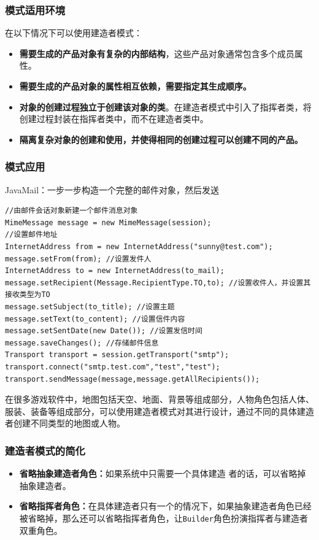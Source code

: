 \subsubsection{模式适用环境}
在以下情况下可以使用建造者模式：
\begin{itemize}
    \item \textbf{需要生成的产品对象有复杂的内部结构}，这些产品对象通常包含多个成员属性。
    \item \textbf{需要生成的产品对象的属性相互依赖，需要指定其生成顺序。}
    \item \textbf{对象的创建过程独立于创建该对象的类}。在建造者模式中引入了指挥者类，将创建过程封装在指挥者类中，而不在建造者类中。
    \item \textbf{隔离复杂对象的创建和使用，并使得相同的创建过程可以创建不同的产品。}
\end{itemize}

\subsubsection{模式应用}
 JavaMail：一步一步构造一个完整的邮件对象，然后发送
\begin{lstlisting}
//由邮件会话对象新建一个邮件消息对象
MimeMessage message = new MimeMessage(session);
//设置邮件地址
InternetAddress from = new InternetAddress("sunny@test.com");
message.setFrom(from); //设置发件人
InternetAddress to = new InternetAddress(to_mail);
message.setRecipient(Message.RecipientType.TO,to); //设置收件人，并设置其接收类型为TO
message.setSubject(to_title); //设置主题
message.setText(to_content); //设置信件内容
message.setSentDate(new Date()); //设置发信时间
message.saveChanges(); //存储邮件信息
Transport transport = session.getTransport("smtp");
transport.connect("smtp.test.com","test","test");
transport.sendMessage(message,message.getAllRecipients());
\end{lstlisting}

 在很多游戏软件中，地图包括天空、地面、背景等组成部分，人物角色包括人体、服装、装备等组成部分，可以使用建造者模式对其进行设计，通过不同的具体建造者创建不同类型的地图或人物。

\subsubsection{建造者模式的简化}
\begin{itemize}
    \item \textbf{省略抽象建造者角色：}如果系统中只需要一个具体建造 者的话，可以省略掉抽象建造者。
    \item \textbf{省略指挥者角色：}在具体建造者只有一个的情况下，如果抽象建造者角色已经被省略掉，那么还可以省略指挥者角色，让\;\verb|Builder|\;角色扮演指挥者与建造者双重角色。
\end{itemize}

